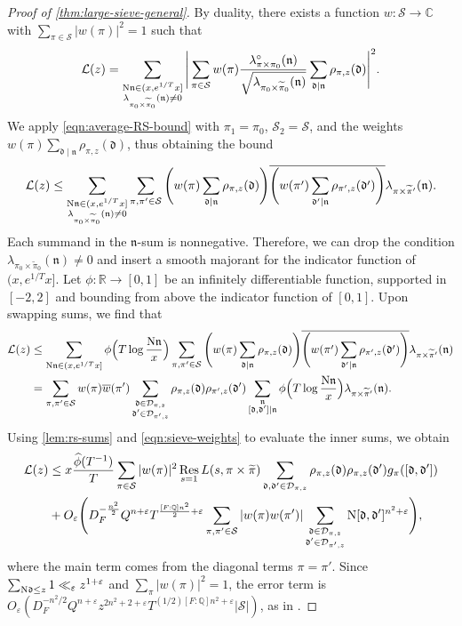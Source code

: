 \documentclass[11pt]{amsart}
\theoremstyle{remark}
\numberwithin{equation}{section}
\renewcommand{\d}{\mathfrak{d}}
\newcommand{\n}{\mathfrak{n}}
\newcommand{\kn}{\mathfrak{n}}
\newcommand{\N}{\textnormal{N}}
\newcommand{\R}{\mathbb{R}}
\newcommand{\Q}{\mathbb{Q}}
\newcommand{\mD}{\mathcal{D}}
\newcommand{\mL}{\mathcal{L}}
\newcommand{\mS}{\mathcal{S}}
\newcommand{\eps}{\varepsilon}
\renewcommand{\bar}{\overline}
\renewcommand{\hat}{\widehat}
\renewcommand{\tilde}{\widetilde}
\newcommand{\Res}{\textnormal{Res}}
\renewcommand{\epsilon}{\varepsilon}
\begin{document}
\begin{proof}[Proof of \cref{thm:large-sieve-general}]
By duality, there exists a function $w : \mS \to \mathbb{C}$ with $\sum_{\pi \in \mS} |w(\pi)|^2 = 1$ such that
\[
    \mL(z) = \sum_{\substack{\N \n \in (x, e^{1/T}x] \\ \lambda_{\pi_0 \times \tilde\pi_0}(\n) \neq 0}} 
    \Bigg| \sum_{\pi \in \mS} w(\pi) \frac{\lambda^\circ_{\pi \times \pi_0}(\n)}{\sqrt{\lambda_{\pi_0 \times \tilde\pi_0}(\n)}} \sum_{\d \mid \n} \rho_{\pi,z}(\d) \Bigg|^2.
\]
We apply \eqref{eqn:average-RS-bound} with $\pi_1 = \pi_0$, $\mS_2 = \mS$, and the weights $w(\pi) \sum_{\d \mid \n} \rho_{\pi,z}(\d)$, thus obtaining the bound
\[
    \mL(z) \le \sum_{\substack{\N \n \in (x, e^{1/T}x] \\ \lambda_{\pi_0 \times \tilde\pi_0}(\n) \neq 0}} 
    \sum_{\pi, \pi' \in \mS} \Bigg(w(\pi) \sum_{\d \mid \n} \rho_{\pi,z}(\d)\Bigg) \bar{\Bigg(w(\pi') \sum_{\d' \mid \n} \rho_{\pi',z}(\d')\Bigg)} \lambda_{\pi \times \tilde\pi'}(\n).
\]
Each summand in the $\kn$-sum is nonnegative.  Therefore, we can drop the condition $\lambda_{\pi_0 \times \tilde\pi_0}(\n) \neq 0$ and insert a smooth majorant for the indicator function of $(x,e^{1/T}x]$.  Let $\phi : \R\to[0,1]$ be an infinitely differentiable function,  supported in $[-2, 2]$ and bounding from above the indicator function of $[0,1]$. Upon swapping sums, we find that
\[
\begin{aligned}
    \mL(z) 
    &\le 
    \sum_{\N\n \in (x, e^{1/T} x]} \phi\Big(T \log \frac{\N \n}{x}\Big)
    \sum_{\pi, \pi' \in \mS} \Bigg(w(\pi) \sum_{\d \mid \n} \rho_{\pi,z}(\d)\Bigg) \bar{\Bigg(w(\pi') \sum_{\d' \mid \n} \rho_{\pi',z}(\d')\Bigg)} \lambda_{\pi \times \tilde\pi'}(\n)
    \\
    &= 
    \sum_{\pi, \pi' \in \mS} w(\pi) \bar w(\pi') \sum_{\substack{\d \in \mD_{\pi,z} \\ \d' \in \mD_{\pi',z}}} \rho_{\pi,z}(\d) \rho_{\pi',z}(\d')
    \sum_{\substack{\n \\ [\d, \d'] \mid \n}} 
    \phi\Big(T \log \frac{\N \n}{x}\Big) \lambda_{\pi \times \tilde\pi'}(\n).
\end{aligned}
\]
Using \cref{lem:rs-sums} and \eqref{eqn:sieve-weights} to evaluate the inner sums, we obtain
\[
\begin{aligned}
    \mL(z) 
    &\le 
    x \frac{\hat\phi(T^{-1})}{T} \sum_{\pi \in \mS} |w(\pi)|^2 \mathop{\Res}_{s = 1} L(s, \pi \times \tilde\pi)
    \sum_{\d, \d' \in \mD_{\pi,z}} \rho_{\pi,z}(\d) \rho_{\pi,z}(\d') g_\pi([\d,\d'])
    \\
    &+
    O_\eps\Bigg(D_F^{-\frac{n^2}{2}}Q^{n+\eps} T^{\frac{[F:\Q]n^2}{2}+\epsilon} \sum_{\pi, \pi' \in \mS} |w(\pi) w(\pi')| \sum_{\substack{\d \in \mD_{\pi,z} \\ \d' \in \mD_{\pi',z}}} \N [\d, \d']^{n^2+\eps} \Bigg),
\end{aligned}
\]
where the main term comes from the diagonal terms $\pi = \pi'$.  Since $\sum_{\N \d \le z} 1 \ll_\eps z^{1+\eps}$ and $\sum_\pi |w(\pi)|^2 = 1$, the error term is $O_\eps(D_F^{-n^2/2}Q^{n+\eps} z^{2n^2+2+\eps} T^{(1/2)[F:\Q]n^2+\epsilon} |\mS| )$, as in \cite[(4.16)]{TZ_GLn}.


\end{proof}
\end{document}
